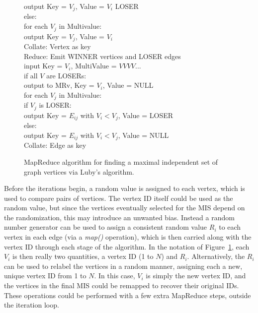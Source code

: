 \begin{figure}[htb]
\begin{center}
{\begin{minipage}{\textwidth}
\begin{tabbing}
     \> \> \> \> \> output Key = $V_j$, Value = $V_i$ LOSER \\
       \> \> \> else: \\
      \> \> \> \> for each $V_j$ in Multivalue: \\
     \> \> \> \> \> output Key = $V_j$, Value = $V_i$ \\
 Collate: \> Vertex as key \\
 Reduce: \> Emit WINNER vertices and LOSER edges \\
       \> \> \> input Key = $V_i$, MultiValue = $V V V V ...$ \\
       \> \> \> if all $V$ are LOSERs: \\
      \> \> \> \> output to MRv, Key = $V_i$, Value = NULL \\
       \> \> \> for each $V_j$ in Multivalue: \\
      \> \> \> \> if $V_j$ is LOSER: \\
     \> \> \> \> \> output Key = $E_{ij}$ with $V_i < V_j$, Value = LOSER \\
      \> \> \> \> else: \\
     \> \> \> \> \> output Key = $E_{ij}$ with $V_i < V_j$, Value = NULL \\
 Collate: \> Edge as key \\

  \end{tabbing}
 \end{minipage}}\end{center}

 \caption{MapReduce algorithm for finding a maximal independent set of
 graph vertices via Luby's algorithm.}

 \label{fig:luby}
\end{figure}

Before the iterations begin, a random value is assigned to each
vertex, which is used to compare pairs of vertices.  The vertex
ID itself could be used as the random value, but since the vertices
eventually selected for the MIS depend on the randomization, this may
introduce an unwanted bias.  Instead a random number generator can be
used to assign a consistent random value $R_i$ to each vertex in each
edge (via a {\it map()} operation), which is then carried along with the
vertex ID through each stage of the algorithm.  In the notation of
Figure~\ref{fig:luby}, each $V_i$ is then really two quantities, a
vertex ID (1 to $N$) and $R_i$.  Alternatively, the $R_i$ can be used
to relabel the vertices in a random manner, assigning each a new,
unique vertex ID from 1 to $N$.  In this case, $V_i$ is simply the new
vertex ID, and the vertices in the final MIS could be remapped to
recover their original IDs.  These operations could be performed with
a few extra MapReduce steps, outside the iteration loop.


